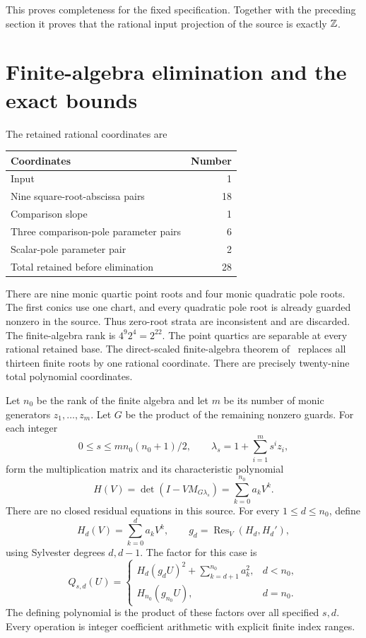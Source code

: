\documentclass[11pt,a4paper]{article}
\begin{document}
This proves completeness for the fixed specification. Together with
the preceding section it proves that the rational input projection
of the source is exactly $\mathbb Z$.

\section{Finite-algebra elimination and the exact bounds}

The retained rational coordinates are
\begin{center}
\begin{tabular}{lr}
\toprule
Coordinates & Number\\
\midrule
Input & 1\\
Nine square-root-abscissa pairs & 18\\
Comparison slope & 1\\
Three comparison-pole parameter pairs & 6\\
Scalar-pole parameter pair & 2\\
\midrule
Total retained before elimination & 28\\
\bottomrule
\end{tabular}
\end{center}
There are nine monic quartic point roots and four monic
quadratic pole roots. The first conics use one chart, and every
quadratic pole root is already guarded nonzero in the source.
Thus zero-root strata are inconsistent and are discarded.
The finite-algebra rank is $4^9 2^4=2^{22}$.
The point quartics are separable at every rational retained base.
The direct-scaled finite-algebra theorem of~\cite{Weighted} replaces
all thirteen finite roots by one rational coordinate. There are
precisely twenty-nine total polynomial coordinates.

Let $n_0$ be the rank of the finite algebra and let $m$ be its
number of monic generators $z_1,\ldots,z_m$. Let $G$ be the product
of the remaining nonzero guards. For each integer
\[
 0\le s\le m n_0(n_0+1)/2,\qquad
 \lambda_s=1+\sum_{i=1}^{m}s^i z_i,
\]
form the multiplication matrix and its characteristic polynomial
\[
 H(V)=\det(I-VM_{G\lambda_s})=\sum_{k=0}^{n_0}a_kV^k.
\]
There are no closed residual equations in this source. For every
$1\le d\le n_0$, define
\[
 H_d(V)=\sum_{k=0}^d a_kV^k,\qquad
 g_d=\operatorname{Res}_V(H_d,H_d'),
\]
using Sylvester degrees $d,d-1$. The factor for this case is
\[
 Q_{s,d}(U)=
 \begin{cases}
 H_d(g_dU)^2+\displaystyle\sum_{k=d+1}^{n_0}a_k^2,&d<n_0,\\[1mm]
 H_{n_0}(g_{n_0}U),&d=n_0.
 \end{cases}
\]
The defining polynomial is the product of these factors over all
specified $s,d$. Every operation is integer coefficient arithmetic
with explicit finite index ranges.
\end{document}
